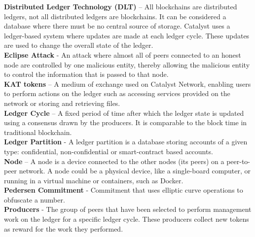 \textbf{Distributed Ledger Technology (DLT)} – All blockchains are distributed ledgers, not all distributed ledgers are blockchains. It can be considered a database where there must be no central source of storage. Catalyst uses a ledger-based system where updates are made at each ledger cycle. These updates are used to change the overall state of the ledger. \\

\textbf{Eclipse Attack} - An attack where almost all of peers connected to an honest node are controlled by one malicious entity, thereby allowing the malicious entity to control the information that is passed to that node. \\

\textbf{KAT tokens} – A medium of exchange used on Catalyst Network, enabling users to perform actions on the ledger such as accessing services provided on the network or storing and retrieving files. \\

\textbf{Ledger Cycle} – A fixed period of time after which the ledger state is updated using a consensus drawn by the producers. It is comparable to the block time in traditional blockchain. \\

\textbf{Ledger Partition} - A ledger partition is a database storing accounts of a given type: confidential, non-confidential or smart-contract based accounts. \\


\textbf{Node} – A node is a device connected to the other nodes (its peers) on a peer-to-peer network. A node could be a physical device, like a single-board computer, or running in a virtual machine or containers, such as Docker. \\

\textbf{Pedersen Commitment} - Commitment that uses elliptic curve operations to obfuscate a number. \\

\textbf{Producers} - The group of peers that have been selected to perform management work on the ledger for a specific ledger cycle. These producers collect new tokens as reward for the work they performed. \\

